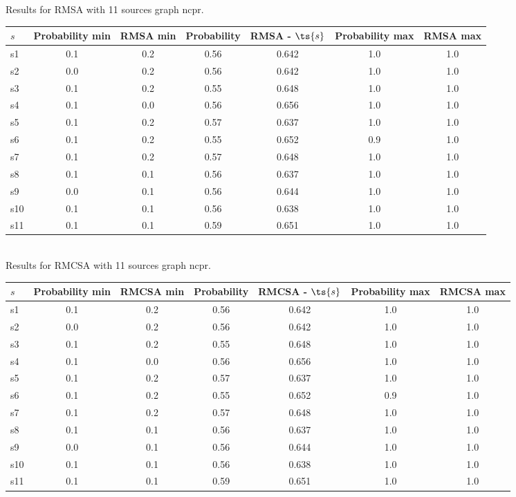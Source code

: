 \documentclass{article}
\begin{document}
\noindent Results for RMSA with 11 sources graph ncpr.

\noindent\begin{tabular}{|l|c|c|c|c|c|c|}
\hline
$s$& Probability min & RMSA min & Probability & RMSA - $\ts{s}$ & Probability max & RMSA max\\
\hline
s1 &0.1 & 0.2 & 0.56 & 0.642 & 1.0 & 1.0\\
\hline
s2 &0.0 & 0.2 & 0.56 & 0.642 & 1.0 & 1.0\\
\hline
s3 &0.1 & 0.2 & 0.55 & 0.648 & 1.0 & 1.0\\
\hline
s4 &0.1 & 0.0 & 0.56 & 0.656 & 1.0 & 1.0\\
\hline
s5 &0.1 & 0.2 & 0.57 & 0.637 & 1.0 & 1.0\\
\hline
s6 &0.1 & 0.2 & 0.55 & 0.652 & 0.9 & 1.0\\
\hline
s7 &0.1 & 0.2 & 0.57 & 0.648 & 1.0 & 1.0\\
\hline
s8 &0.1 & 0.1 & 0.56 & 0.637 & 1.0 & 1.0\\
\hline
s9 &0.0 & 0.1 & 0.56 & 0.644 & 1.0 & 1.0\\
\hline
s10 &0.1 & 0.1 & 0.56 & 0.638 & 1.0 & 1.0\\
\hline
s11 &0.1 & 0.1 & 0.59 & 0.651 & 1.0 & 1.0\\
\hline
\end{tabular}\\

\noindent Results for RMCSA with 11 sources graph ncpr.

\noindent\begin{tabular}{|l|c|c|c|c|c|c|}
\hline
$s$& Probability min & RMCSA min & Probability & RMCSA - $\ts{s}$ & Probability max & RMCSA max\\
\hline
s1 &0.1 & 0.2 & 0.56 & 0.642 & 1.0 & 1.0\\
\hline
s2 &0.0 & 0.2 & 0.56 & 0.642 & 1.0 & 1.0\\
\hline
s3 &0.1 & 0.2 & 0.55 & 0.648 & 1.0 & 1.0\\
\hline
s4 &0.1 & 0.0 & 0.56 & 0.656 & 1.0 & 1.0\\
\hline
s5 &0.1 & 0.2 & 0.57 & 0.637 & 1.0 & 1.0\\
\hline
s6 &0.1 & 0.2 & 0.55 & 0.652 & 0.9 & 1.0\\
\hline
s7 &0.1 & 0.2 & 0.57 & 0.648 & 1.0 & 1.0\\
\hline
s8 &0.1 & 0.1 & 0.56 & 0.637 & 1.0 & 1.0\\
\hline
s9 &0.0 & 0.1 & 0.56 & 0.644 & 1.0 & 1.0\\
\hline
s10 &0.1 & 0.1 & 0.56 & 0.638 & 1.0 & 1.0\\
\hline
s11 &0.1 & 0.1 & 0.59 & 0.651 & 1.0 & 1.0\\
\hline
\end{tabular}\\
\end{document}
